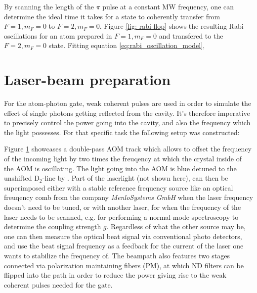 By scanning the length of the $\pi$ pulse at a constant MW frequency, one can determine the ideal time it takes for a state to coherently transfer from $F=1,m_F=0$ to $F=2,m_F=0$. Figure \ref{fig: rabi flop} shows the resulting Rabi oscillations for an atom prepared in $F=1,m_F=0$ and transfered to the $F=2,m_F=0$ state. Fitting equation \eqref{eq:rabi_oscillation_model}, 

\section{Laser-beam preparation}

For the atom-photon gate, weak coherent pulses are used in order to simulate the effect of single photons getting reflected from the cavity. It's therefore imperative to precisely control the power going into the cavity, and also the frequency which the light possesses. For that specific task the following setup was constructed:

\begin{figure}[h]
	\centering
	
	\label{fig: optical_path}
\end{figure}

Figure \ref{fig: optical_path} showcases a double-pass AOM track which allows to offset the frequency of the incoming light by two times the freuqency at which the crystal inside of the AOM is oscillating. The light going into the AOM is blue detuned to the unshifted $\text{D}_2\text{-line}$ by . Part of the laserlight (not shown here), can then be superimposed either with a stable reference frequency source like an optical freuqency comb from the company \textit{MenloSystems GmbH} when the laser frequency doesn't need to be tuned, or with another laser, for when the frequency of the laser needs to be scanned, e.g. for performing a normal-mode spectroscopy to determine the coupling strength $g$. Regardless of what the other source may be, one can then measure the optical beat signal via conventional photo detectors, and use the beat signal frequency as a feedback for the current of the laser one wants to stabilize the frequency of. The beampath also features two stages connected via polarization maintaining fibers (PM), at which ND filters can be flipped into the path in order to reduce the power giving rise to the weak coherent pulses needed for the gate.\\

